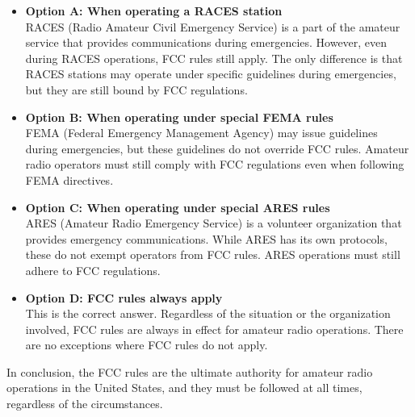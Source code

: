 \begin{itemize}
    \item \textbf{Option A: When operating a RACES station} \\
    RACES (Radio Amateur Civil Emergency Service) is a part of the amateur service that provides communications during emergencies. However, even during RACES operations, FCC rules still apply. The only difference is that RACES stations may operate under specific guidelines during emergencies, but they are still bound by FCC regulations.

    \item \textbf{Option B: When operating under special FEMA rules} \\
    FEMA (Federal Emergency Management Agency) may issue guidelines during emergencies, but these guidelines do not override FCC rules. Amateur radio operators must still comply with FCC regulations even when following FEMA directives.

    \item \textbf{Option C: When operating under special ARES rules} \\
    ARES (Amateur Radio Emergency Service) is a volunteer organization that provides emergency communications. While ARES has its own protocols, these do not exempt operators from FCC rules. ARES operations must still adhere to FCC regulations.

    \item \textbf{Option D: FCC rules always apply} \\
    This is the correct answer. Regardless of the situation or the organization involved, FCC rules are always in effect for amateur radio operations. There are no exceptions where FCC rules do not apply.
\end{itemize}

In conclusion, the FCC rules are the ultimate authority for amateur radio operations in the United States, and they must be followed at all times, regardless of the circumstances.

